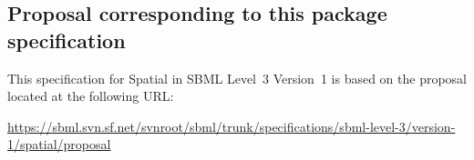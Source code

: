 



\pagebreak

\subsection{Proposal corresponding to this package specification}

This specification for Spatial in SBML Level~3 Version~1 is based on the proposal located at the following URL:

\begin{center}
  \vspace*{1ex}\small
  \url{https://sbml.svn.sf.net/svnroot/sbml/trunk/specifications/sbml-level-3/version-1/spatial/proposal}
  \vspace*{1ex}
\end{center}

